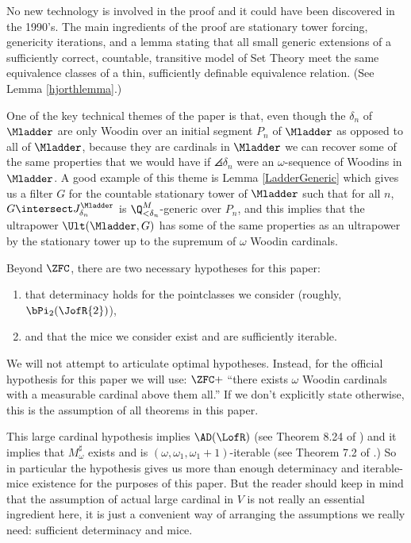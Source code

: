 \documentclass[oneside,12pt]{amsart}
\begin{document}
No new technology is involved in the proof and it could have been discovered in the 1990's. The main ingredients
of the proof are stationary tower forcing, genericity iterations, and a lemma stating that
all small generic extensions of a sufficiently correct, countable, transitive model of Set Theory
meet the same equivalence classes of a thin, sufficiently
definable equivalence
relation. (See Lemma \ref{hjorthlemma}.)

One of the key technical themes of the paper is that, even though
the $\delta_n$ of $\Mladder$ are only Woodin over an initial segment $P_n$
of $\Mladder$ as opposed to all of $\Mladder$, because they are
cardinals in $\Mladder$ we can recover some of the same properties
that we would have if $\angles{\delta_n}$ were an $\omega$-sequence
of Woodins in $\Mladder$. A good example of this theme is Lemma
\ref{LadderGeneric} which gives us a filter $G$ for the countable
stationary tower of $\Mladder$ such that for all $n$,
$G\intersect J^{\Mladder}_{\delta_n}$ is $\Q_{<\delta_n}^M$-generic over $P_n$, and this implies
that the ultrapower $\Ult(\Mladder, G)$ has some of the same properties as an
ultrapower by the stationary tower up to the supremum
of $\omega$ Woodin cardinals.

Beyond $\ZFC$, there are two necessary hypotheses for this paper:
\begin{enumerate}
\item that determinacy holds for the pointclasses we consider (roughly, $\bPi_2(\JofR{2})$),
\item and that the mice we consider exist and are sufficiently iterable.
\end{enumerate}
We will not attempt to articulate optimal hypotheses. Instead, for the official hypothesis for this paper we will
use: 
 $\ZFC + $ ``there exists $\omega$ Woodin cardinals with a measurable cardinal above them all.''   If we don't explicitly state otherwise, this is the assumption of all
 theorems in this paper.

 This large cardinal hypothesis implies $\AD(\LofR)$ (see
 Theorem 8.24 of \cite{DeterminacyInLOfR}) and it implies that
 $M_{\omega}^{\sharp}$ exists and is $(\omega,\omega_1,\omega_1+1)$-iterable (see
 Theorem 7.2 of \cite{OutlineOfInnerModelTheory}.) So in particular the hypothesis gives us more
 than enough determinacy and iterable-mice existence for the purposes of this paper. 
 But the reader should keep in
 mind that the assumption of actual large cardinal in $V$ is not really
 an essential ingredient here, it is just a convenient way of arranging the
 assumptions we really need: sufficient determinacy and mice.
\end{document}
